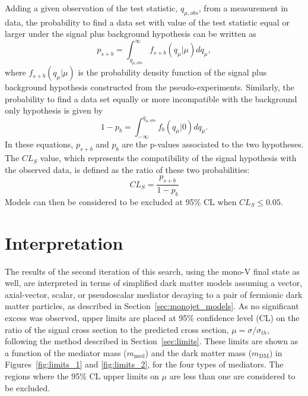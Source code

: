 Adding a given observation of the test statistic, $q_{\mu, obs}$, from a measurement in data, the probability to find a data set with value of the test statistic equal or larger under the signal plus background hypothesis can be written as
\begin{equation}
 p_{s+b} = \int_{q_{\mu, obs}}^{\infty} f_{s+b}\left( q_{\mu}|\mu \right)dq_{\mu},
\end{equation}
where $ f_{s+b}\left( q_{\mu}|\mu \right)$ is the probability density function of the signal plus background hypothesis constructed from the pseudo-experiments. Similarly, the probability to find a data set equally or more incompatible with the background only hypothesis is given by
\begin{equation}
 1 - p_b = \int^{q_{\mu, obs}}_{-\infty} f_b\left( q_{\mu}|0 \right)dq_{\mu}.
\end{equation}
In these equations, $p_{s+b}$ and $p_b$ are the p-values associated to the two hypotheses. The $CL_S$ value, which represents the compatibility of the signal hypothesis with the observed data, is defined as the ratio of these two probabilities:
\begin{equation}
 CL_S = \frac{p_{s+b}}{1 - p_b}
\end{equation}
Models can then be considered to be excluded at 95\% CL when $CL_S \leq 0.05$.

\section{Interpretation}
\label{sec:interpretation}

The results of the second iteration of this search, using the mono-V final state as well, are interpreted in terms of simplified dark matter models assuming a vector, axial-vector, scalar, or pseudoscalar mediator decaying to a pair of fermionic dark matter particles, as described in Section~\ref{sec:monojet_models}. As no significant excess was observed, upper limits are placed at 95\% confidence level (CL) on the ratio of the signal cross section to the predicted cross section, $\mu = \sigma/\sigma_{th}$, following the method described in Section~\ref{sec:limits}. These limits are shown as a function of the mediator mass ($m_{\mathrm{med}}$) and the dark matter mass ($m_{\mathrm{DM}}$) in Figures~\ref{fig:limits_1} and \ref{fig:limits_2}, for the four types of mediators. The regions where the 95\% CL upper limits on $\mu$ are less than one are considered to be excluded.


